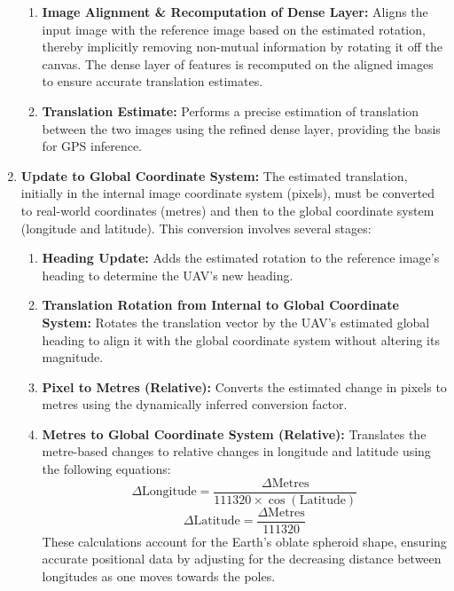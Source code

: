 \begin{enumerate}
\begin{enumerate}
        \item \textbf{Image Alignment \& Recomputation of Dense Layer:}  
        Aligns the input image with the reference image based on the estimated rotation, thereby implicitly removing non-mutual information by rotating it off the canvas. The dense layer of features is recomputed on the aligned images to ensure accurate translation estimates.
        
        \item \textbf{Translation Estimate:}  
        Performs a precise estimation of translation between the two images using the refined dense layer, providing the basis for GPS inference.
    \end{enumerate}

    \item \textbf{Update to Global Coordinate System:}  
    The estimated translation, initially in the internal image coordinate system (pixels), must be converted to real-world coordinates (metres) and then to the global coordinate system (longitude and latitude). This conversion involves several stages:
    \begin{enumerate}
        \item \textbf{Heading Update:}  
        Adds the estimated rotation to the reference image's heading to determine the UAV's new heading.
        
        \item \textbf{Translation Rotation from Internal to Global Coordinate System:}  
        Rotates the translation vector by the UAV's estimated global heading to align it with the global coordinate system without altering its magnitude.
        
        \item \textbf{Pixel to Metres (Relative):}  
        Converts the estimated change in pixels to metres using the dynamically inferred conversion factor. 
        
        \item \textbf{Metres to Global Coordinate System (Relative):}  
        Translates the metre-based changes to relative changes in longitude and latitude using the following equations:
        \begin{equation}
            \Delta \text{Longitude} = \frac{\Delta \text{Metres}}{111320 \times \cos(\text{Latitude})}
        \end{equation}
        \begin{equation}
            \Delta \text{Latitude} = \frac{\Delta \text{Metres}}{111320}
        \end{equation}
        These calculations account for the Earth's oblate spheroid shape, ensuring accurate positional data by adjusting for the decreasing distance between longitudes as one moves towards the poles.
        

\end{enumerate}
\end{enumerate}
